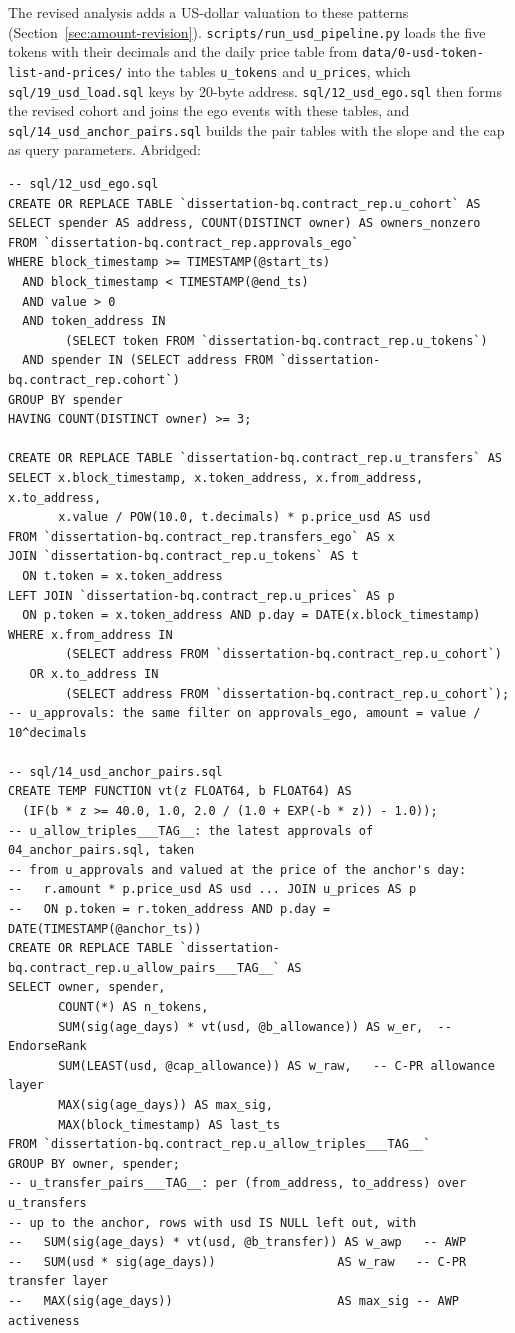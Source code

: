 The revised analysis adds a US-dollar valuation to these patterns (Section~\ref{sec:amount-revision}). \texttt{scripts/run\_usd\_pipeline.py} loads the five tokens with their decimals and the daily price table from \texttt{data/0-usd-token-list-and-prices/} into the tables \texttt{u\_tokens} and \texttt{u\_prices}, which \texttt{sql/19\_usd\_load.sql} keys by 20-byte address. \texttt{sql/12\_usd\_ego.sql} then forms the revised cohort and joins the ego events with these tables, and \texttt{sql/14\_usd\_anchor\_pairs.sql} builds the pair tables with the slope and the cap as query parameters. Abridged:

\begin{verbatim}
-- sql/12_usd_ego.sql
CREATE OR REPLACE TABLE `dissertation-bq.contract_rep.u_cohort` AS
SELECT spender AS address, COUNT(DISTINCT owner) AS owners_nonzero
FROM `dissertation-bq.contract_rep.approvals_ego`
WHERE block_timestamp >= TIMESTAMP(@start_ts)
  AND block_timestamp < TIMESTAMP(@end_ts)
  AND value > 0
  AND token_address IN
        (SELECT token FROM `dissertation-bq.contract_rep.u_tokens`)
  AND spender IN (SELECT address FROM `dissertation-bq.contract_rep.cohort`)
GROUP BY spender
HAVING COUNT(DISTINCT owner) >= 3;

CREATE OR REPLACE TABLE `dissertation-bq.contract_rep.u_transfers` AS
SELECT x.block_timestamp, x.token_address, x.from_address, x.to_address,
       x.value / POW(10.0, t.decimals) * p.price_usd AS usd
FROM `dissertation-bq.contract_rep.transfers_ego` AS x
JOIN `dissertation-bq.contract_rep.u_tokens` AS t
  ON t.token = x.token_address
LEFT JOIN `dissertation-bq.contract_rep.u_prices` AS p
  ON p.token = x.token_address AND p.day = DATE(x.block_timestamp)
WHERE x.from_address IN
        (SELECT address FROM `dissertation-bq.contract_rep.u_cohort`)
   OR x.to_address IN
        (SELECT address FROM `dissertation-bq.contract_rep.u_cohort`);
-- u_approvals: the same filter on approvals_ego, amount = value / 10^decimals

-- sql/14_usd_anchor_pairs.sql
CREATE TEMP FUNCTION vt(z FLOAT64, b FLOAT64) AS
  (IF(b * z >= 40.0, 1.0, 2.0 / (1.0 + EXP(-b * z)) - 1.0));
-- u_allow_triples___TAG__: the latest approvals of 04_anchor_pairs.sql, taken
-- from u_approvals and valued at the price of the anchor's day:
--   r.amount * p.price_usd AS usd ... JOIN u_prices AS p
--   ON p.token = r.token_address AND p.day = DATE(TIMESTAMP(@anchor_ts))
CREATE OR REPLACE TABLE `dissertation-bq.contract_rep.u_allow_pairs___TAG__` AS
SELECT owner, spender,
       COUNT(*) AS n_tokens,
       SUM(sig(age_days) * vt(usd, @b_allowance)) AS w_er,  -- EndorseRank
       SUM(LEAST(usd, @cap_allowance)) AS w_raw,   -- C-PR allowance layer
       MAX(sig(age_days)) AS max_sig,
       MAX(block_timestamp) AS last_ts
FROM `dissertation-bq.contract_rep.u_allow_triples___TAG__`
GROUP BY owner, spender;
-- u_transfer_pairs___TAG__: per (from_address, to_address) over u_transfers
-- up to the anchor, rows with usd IS NULL left out, with
--   SUM(sig(age_days) * vt(usd, @b_transfer)) AS w_awp   -- AWP
--   SUM(usd * sig(age_days))                 AS w_raw   -- C-PR transfer layer
--   MAX(sig(age_days))                       AS max_sig -- AWP activeness
\end{verbatim}

